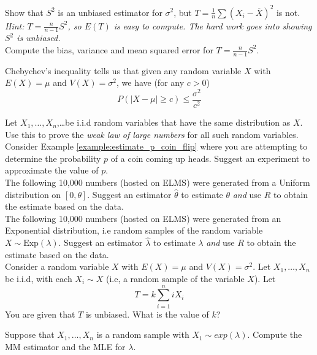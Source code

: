 \thischapterexercises

\exerciseitem Show that $S^2$ is an unbiased estimator for $\sigma^2$, but $T = \frac{1}{n} \sum (X_i - \overline{X})^2$ is not. \textit{Hint: $T= \frac{n}{n-1} S^2$, so $E(T)$ is easy to compute. The hard work goes into showing $S^2$ is unbiased.}\\

\exerciseitem Compute the bias, variance and mean squared error for $T= \frac{n}{n-1} S^2$. 

\exerciseitem Chebychev's inequality tells us that given any random variable $X$ with $E(X) = \mu$ and $V(X) = \sigma^2$, we have (for any $c > 0$)
\[
P\left(|X - \mu| \geq c\right) \leq \frac{\sigma^2}{c^2}
\]

Let $X_1, \ldots, X_n$,\ldots be i.i.d random variables that have the same distribution as $X$. Use this to prove the \textit{weak law of large numbers} for all such random variables. \\

\exerciseitem Consider Example \ref{example:estimate_p_coin_flip} where you are attempting to determine the probability $p$ of a coin coming up heads. Suggest an experiment to approximate the value of $p$. \\

\exerciseitem The following 10,000 numbers (hosted on ELMS) were generated from a Uniform distribution on $[0,\theta]$. Suggest an estimator $\hat{\theta}$ to estimate $\theta$ \textit{and} use $R$ to obtain the estimate based on the data. \\

\exerciseitem  The following 10,000 numbers (hosted on ELMS) were generated from an Exponential distribution, i.e random samples of the random variable $X \sim \text{Exp}(\lambda)$. Suggest an estimator $\hat{\lambda}$ to estimate $\lambda$ \textit{and} use $R$ to obtain the estimate based on the data.\\

\exerciseitem Consider a random variable $X$ with $E(X) = \mu$ and $V(X) = \sigma^2$. Let $X_1, \ldots, X_n$ be i.i.d, with each $X_i \sim X$ (i.e, a random sample of the variable $X$). Let
\[
T = k \sum_{i=1}^n i X_i
\]
You are given that $T$ is unbiased. What is the value of $k$?


\exerciseitem Suppose that $X_1, \ldots, X_n$ is a random sample with $X_1 \sim exp(\lambda)$. Compute the MM estimator and the MLE for $\lambda$. \\

